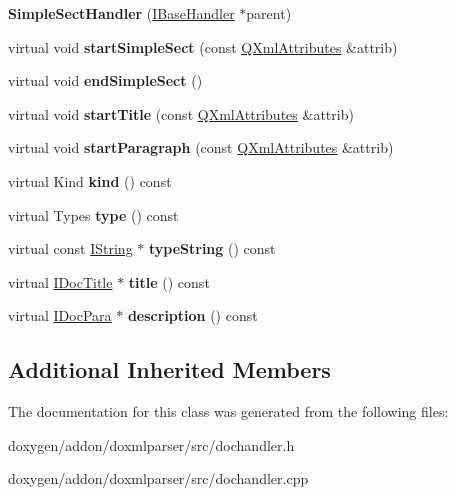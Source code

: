 \begin{DoxyCompactItemize}
\item 
\mbox{\label{class_simple_sect_handler_a55ec7f38e36cfa300bbc1d80583b35ef}} 
{\bfseries Simple\+Sect\+Handler} (\mbox{\hyperlink{class_i_base_handler}{I\+Base\+Handler}} $\ast$parent)
\item 
\mbox{\label{class_simple_sect_handler_a2d1574a2a5b5cf78bd5686d9d24dbeb8}} 
virtual void {\bfseries start\+Simple\+Sect} (const \mbox{\hyperlink{class_q_xml_attributes}{Q\+Xml\+Attributes}} \&attrib)
\item 
\mbox{\label{class_simple_sect_handler_a339aa93922947bed597ade0e7663e8b0}} 
virtual void {\bfseries end\+Simple\+Sect} ()
\item 
\mbox{\label{class_simple_sect_handler_a79017376feedc52e686a890a800a8808}} 
virtual void {\bfseries start\+Title} (const \mbox{\hyperlink{class_q_xml_attributes}{Q\+Xml\+Attributes}} \&attrib)
\item 
\mbox{\label{class_simple_sect_handler_a8d2cceaace4546315fb088f805086c62}} 
virtual void {\bfseries start\+Paragraph} (const \mbox{\hyperlink{class_q_xml_attributes}{Q\+Xml\+Attributes}} \&attrib)
\item 
\mbox{\label{class_simple_sect_handler_ae0f4f8eaebe0e0cb0fbee117c5972f85}} 
virtual Kind {\bfseries kind} () const
\item 
\mbox{\label{class_simple_sect_handler_a9688305e3714bae4929f7aadb56898bd}} 
virtual Types {\bfseries type} () const
\item 
\mbox{\label{class_simple_sect_handler_acdb12794f16bcf5cadce5a0d262f680f}} 
virtual const \mbox{\hyperlink{class_i_string}{I\+String}} $\ast$ {\bfseries type\+String} () const
\item 
\mbox{\label{class_simple_sect_handler_a1dbeb2b414f0a7704bfcd143d64a8888}} 
virtual \mbox{\hyperlink{class_i_doc_title}{I\+Doc\+Title}} $\ast$ {\bfseries title} () const
\item 
\mbox{\label{class_simple_sect_handler_ad660dc0681ea861567fbcfea23d26308}} 
virtual \mbox{\hyperlink{class_i_doc_para}{I\+Doc\+Para}} $\ast$ {\bfseries description} () const
\end{DoxyCompactItemize}
\subsection*{Additional Inherited Members}


The documentation for this class was generated from the following files\+:\begin{DoxyCompactItemize}
\item 
doxygen/addon/doxmlparser/src/dochandler.\+h\item 
doxygen/addon/doxmlparser/src/dochandler.\+cpp\end{DoxyCompactItemize}
